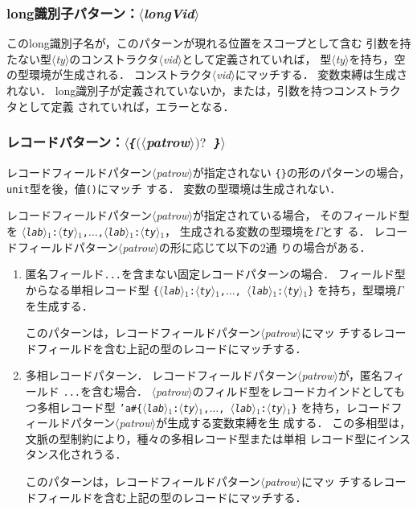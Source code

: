 \documentclass{jbook}
\newcommand{\code}[1]{\mbox{\large\tt #1}}
\newcommand{\nonterm}[1]{\mbox{$\langle$}{\it #1}\mbox{$\rangle$}}
\newcommand{\term}[1]{\mbox{{\tt #1}}}
\newcommand{\optional}[1]{\mbox{$($}{\protect #1}\mbox{$)?$}}
\newcommand{\ass}{\Gamma}
\begin{document}
\subsubsection{long識別子パターン：\nonterm{longVid}}

	このlong識別子名が，このパターンが現れる位置をスコープとして含む
引数を持たない型\nonterm{ty}のコンストラクタ\nonterm{vid}として定義されていれば，
型\nonterm{ty}を持ち，空の型環境が生成される．
	コンストラクタ\nonterm{vid}にマッチする．
	変数束縛は生成されない．
	long識別子が定義されていないか，または，引数を持つコンストラクタとして定義
されていれば，エラーとなる．

\subsubsection{レコードパターン：\nonterm{\term{\{}\optional{\nonterm{patrow}}\ \term{\}}}}

		レコードフィールドパターン\nonterm{patrow}が指定されない
\code{\{\}}の形のパターンの場合，\code{unit}型を後，値\code{()}にマッチ
する．
	変数の型環境は生成されない．

	レコードフィールドパターン\nonterm{patrow}が指定されている場合，
そのフィールド型を
\code{\nonterm{lab}$_1$:\nonterm{ty}$_1$,$\ldots$,\nonterm{lab}$_1$:\nonterm{ty}$_1$}，
生成される変数の型環境を$\ass$とす
る．
	レコードフィールドパターン\nonterm{patrow}の形に応じて以下の2通
りの場合がある．
\begin{enumerate}
\item 匿名フィールド\verb|...|を含まない固定レコードパターンの場合．
フィールド型からなる単相レコード型
\code{\{\nonterm{lab}$_1$:\nonterm{ty}$_1$,$\ldots$,
\nonterm{lab}$_1$:\nonterm{ty}$_1$\}}
を持ち，型環境$\ass$を生成する．

	このパターンは，レコードフィールドパターン\nonterm{patrow}にマッ
チするレコードフィールドを含む上記の型のレコードにマッチする．

\item 多相レコードパターン．
	レコードフィールドパターン\nonterm{patrow}が，匿名フィールド
\verb|...|を含む場合．
	\nonterm{patrow}のフィルド型をレコードカインドとしてもつ多相レコード型
\code{'a\#\{\nonterm{lab}$_1$:\nonterm{ty}$_1$,$\ldots$,
\nonterm{lab}$_1$:\nonterm{ty}$_1$\}}
を持ち，レコードフィールドパターン\nonterm{patrow}が生成する変数束縛を生
成する．
	この多相型は，文脈の型制約により，種々の多相レコード型または単相
レコード型にインスタンス化されうる．

	このパターンは，レコードフィールドパターン\nonterm{patrow}にマッ
チするレコードフィールドを含む上記の型のレコードにマッチする．
\end{enumerate}
\end{document}

